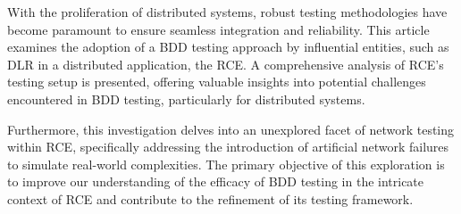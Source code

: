 With the proliferation of distributed systems, robust testing methodologies have become paramount to ensure seamless integration and reliability. This article examines the adoption of a \ac{BDD} testing approach by influential entities, such as \ac{DLR} in a distributed application, the \ac{RCE}. A comprehensive analysis of \ac{RCE}'s testing setup is presented, offering valuable insights into potential challenges encountered in \ac{BDD} testing, particularly for distributed systems.

Furthermore, this investigation delves into an unexplored facet of network testing within \ac{RCE}, specifically addressing the introduction of artificial network failures to simulate real-world complexities. The primary objective of this exploration is to improve our understanding of the efficacy of \ac{BDD} testing in the intricate context of \ac{RCE} and contribute to the refinement of its testing framework.